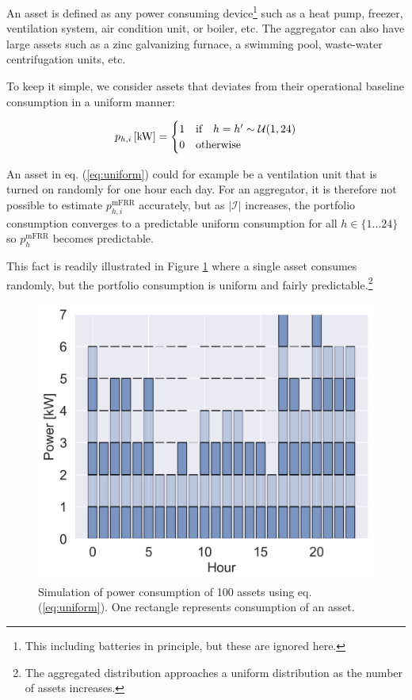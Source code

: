 \documentclass[lettersize,journal]{IEEEtran}
\begin{document}
An asset is defined as any power consuming device\footnote{This including batteries in principle, but these are ignored here.} such as a heat pump, freezer, ventilation system, air condition unit, or boiler, etc. The aggregator can also have large assets such as a zinc galvanizing furnace, a swimming pool, waste-water centrifugation units, etc.

To keep it simple, we consider assets that deviates from their operational baseline consumption in a uniform manner:

\begin{align}\label{eq:uniform}
    p_{h,i} \thinspace [\text{kW}] = \begin{cases}
                                         1 & \text{if} \quad h = h^{\prime} \sim \mathcal{U}(1,24) \\
                                         0 & \text{otherwise}
                                     \end{cases}
\end{align}

An asset in eq. (\ref{eq:uniform}) could for example be a ventilation unit that is turned on randomly for one hour each day. For an aggregator, it is therefore not possible to estimate $p^{\text{mFRR}}_{h, i}$ accurately, but as $|\mathcal{I}|$ increases, the portfolio consumption converges to a predictable uniform consumption for all $h \in \{1 \hdots 24 \}$ so $p^{\text{mFRR}}_{h}$ becomes predictable.

This fact is readily illustrated in Figure \ref{fig:assets} where a single asset consumes randomly, but the portfolio consumption is uniform and fairly predictable.\footnote{The aggregated distribution approaches a uniform distribution as the number of assets increases.}

\begin{figure}[!t]
    \centering
    \includegraphics[width=\columnwidth]{figures/assets2.png}
    \caption{Simulation of power consumption of 100 assets using eq. (\ref{eq:uniform}). One rectangle represents consumption of an asset.}
    \label{fig:assets}
\end{figure}
\end{document}
